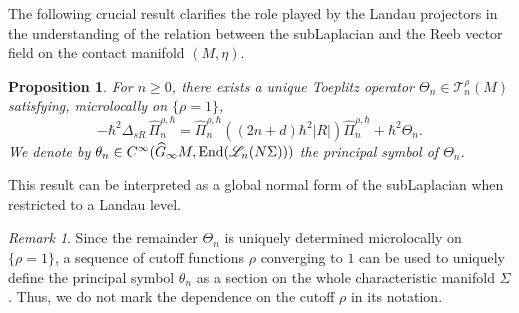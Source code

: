 \documentclass[12pt,a4paper]{amsart}
\theoremstyle{plain}
\newtheorem{proposition}[theorem]{Proposition}
\theoremstyle{definition}
\theoremstyle{remark}
\newtheorem{remark}[theorem]{Remark}
\numberwithin{equation}{section}
\theoremstyle{definition}
\def \Ghat{\widehat{G}}
\numberwithin{equation}{section}
\begin{document}
\vspace{0.25cm}

The following crucial result clarifies the role played by the Landau projectors in the understanding of the relation between the subLaplacian and the Reeb vector field on the contact manifold $(M,\eta)$.

\begin{proposition}
    \label{prop:opeffectif}
    For $n\geq 0$, there exists a unique Toeplitz operator $\Theta_n\in\mathscr{T}_n^\rho(M)$ satisfying, microlocally on $\{\rho = 1\}$,
    \begin{equation}
        \label{eq:effectiflandau}
        -\hbar^2 \Delta_{sR}\,\hat{\Pi}_n^{\rho,\hbar} = \hat{\Pi}_n^{\rho,\hbar}\left((2n+d)\hbar^2|R|\right)\hat{\Pi}_n^{\rho,\hbar} + \hbar^2 \Theta_n.
    \end{equation}
    We denote by $\theta_n\in C^\infty(\Ghat_\infty M,{\rm End}(\mathscr{L}_n(N\Sigma)))$ the principal symbol of $\Theta_n$.
\end{proposition}

This result can be interpreted as a global normal form of the subLaplacian when restricted to a Landau level.

\begin{remark}
    Since the remainder $\Theta_n$ is uniquely determined microlocally on $\{\rho = 1\}$, a sequence of cutoff functions $\rho$ converging to $1$ can be used to uniquely define the principal symbol $\theta_n$ as a section on the whole characteristic manifold $\Sigma$. Thus, we do not mark the dependence on the cutoff $\rho$ in its notation.
\end{remark}
\end{document}
